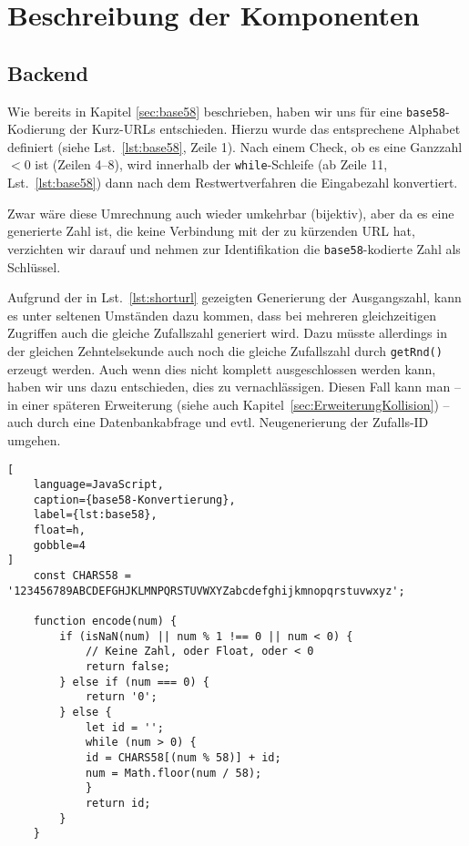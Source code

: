 \documentclass[a4paper,11pt,DIV=12,overfullrule=on]{scrreprt}%
\begin{document}
\section{Beschreibung der Komponenten}
\subsection{Backend}
Wie bereits in Kapitel \ref{sec:base58} beschrieben, haben wir uns für eine \texttt{base58}-Kodierung der Kurz-\ac{URL}s entschieden. Hierzu wurde das entsprechene Alphabet definiert (siehe Lst.~\ref{lst:base58}, Zeile 1). Nach einem Check, ob es eine Ganzzahl $< 0$ ist (Zeilen 4–8), wird innerhalb der \texttt{while}-Schleife (ab Zeile 11, Lst.~\ref{lst:base58}) dann nach dem Restwertverfahren die Eingabezahl konvertiert.

Zwar wäre diese Umrechnung auch wieder umkehrbar (bijektiv), aber da es eine generierte Zahl ist, die keine Verbindung mit der zu kürzenden \ac{URL} hat, verzichten wir darauf und nehmen zur Identifikation die \texttt{base58}-kodierte Zahl als Schlüssel.

Aufgrund der in Lst.~\ref{lst:shorturl} gezeigten Generierung der Ausgangszahl, kann es unter seltenen Umständen dazu kommen, dass bei mehreren gleichzeitigen Zugriffen auch die gleiche Zufallszahl generiert wird. Dazu müsste allerdings in der gleichen Zehntelsekunde auch noch die gleiche Zufallszahl durch \texttt{getRnd()} erzeugt werden. Auch wenn dies nicht komplett ausgeschlossen werden kann, haben wir uns dazu entschieden, dies zu vernachlässigen. Diesen Fall kann man – in einer späteren Erweiterung (siehe auch Kapitel~\ref{sec:ErweiterungKollision}) – auch durch eine Datenbankabfrage und evtl. Neugenerierung der Zufalls-ID umgehen.

\begin{lstlisting}[
    language=JavaScript,
    caption={base58-Konvertierung},
    label={lst:base58},
    float=h,
    gobble=4
]
    const CHARS58 = '123456789ABCDEFGHJKLMNPQRSTUVWXYZabcdefghijkmnopqrstuvwxyz';

    function encode(num) {
        if (isNaN(num) || num % 1 !== 0 || num < 0) {
            // Keine Zahl, oder Float, oder < 0
            return false;
        } else if (num === 0) {
            return '0';
        } else {
            let id = '';
            while (num > 0) {
            id = CHARS58[(num % 58)] + id;
            num = Math.floor(num / 58);
            }
            return id;
        }
    }
\end{lstlisting}
\end{document}

